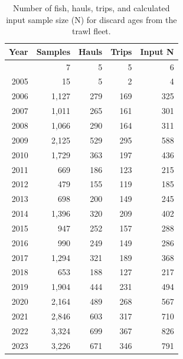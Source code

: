 \documentclass[
  english,
]{article}
\begin{document}
\begingroup
\fontsize{9.0pt}{11.0pt}\selectfont

\begin{longtable}{rrrrr}

\caption{\label{tbl-discard-trawl-age-samples}Number of fish, hauls,
trips, and calculated input sample size (N) for discard ages from the
trawl fleet.}

\tabularnewline

\toprule
Year & Samples & Hauls & Trips & Input N \\ 
\midrule\addlinespace[2.5pt]
2004 & 7 & 5 & 5 & 6 \\ 
2005 & 15 & 5 & 2 & 4 \\ 
2006 & 1,127 & 279 & 169 & 325 \\ 
2007 & 1,011 & 265 & 161 & 301 \\ 
2008 & 1,066 & 290 & 164 & 311 \\ 
2009 & 2,125 & 529 & 295 & 588 \\ 
2010 & 1,729 & 363 & 197 & 436 \\ 
2011 & 669 & 186 & 123 & 215 \\ 
2012 & 479 & 155 & 119 & 185 \\ 
2013 & 698 & 200 & 149 & 245 \\ 
2014 & 1,396 & 320 & 209 & 402 \\ 
2015 & 947 & 252 & 157 & 288 \\ 
2016 & 990 & 249 & 149 & 286 \\ 
2017 & 1,294 & 321 & 189 & 368 \\ 
2018 & 653 & 188 & 127 & 217 \\ 
2019 & 1,904 & 444 & 231 & 494 \\ 
2020 & 2,164 & 489 & 268 & 567 \\ 
2021 & 2,846 & 603 & 317 & 710 \\ 
2022 & 3,324 & 699 & 367 & 826 \\ 
2023 & 3,226 & 671 & 346 & 791 \\ 
\bottomrule

\end{longtable}

\endgroup

\pagebreak

\begingroup
\fontsize{9.0pt}{11.0pt}\selectfont
\end{document}
